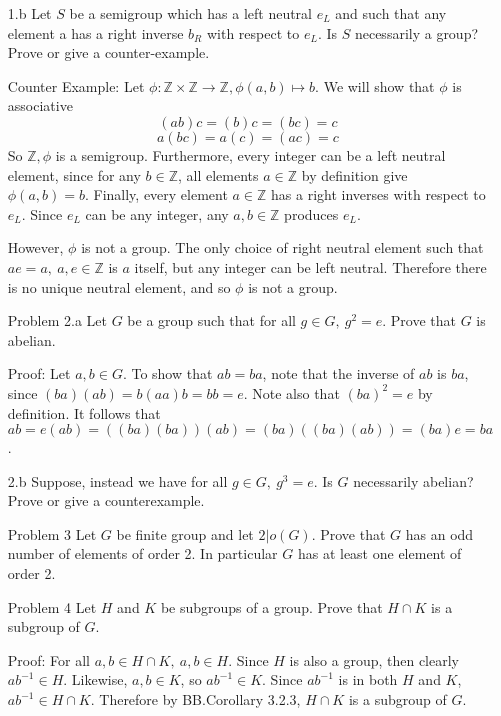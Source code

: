 \documentclass[letterpaper]{article}
\newcommand{\Integers}{\mathbb{Z}}
\begin{document}
\begin{itemize}
    \item[1.b] Let \(S\) be a semigroup which has a left neutral \(e_L\) and such that any element a has a right inverse \(b_R\) with respect to \(e_L\). Is \(S\) necessarily a group? Prove or give a counter-example.

          Counter Example: Let \(\phi: \Integers \times \Integers \rightarrow \Integers, \phi(a, b) \mapsto b\). We will show that  \(\phi\) is associative \[(ab)c = (b)c = (bc) = c\] \[a(bc) = a(c) = (ac) = c\]
          So \(\Integers, \phi\) is a semigroup. Furthermore, every integer can be a left neutral element, since for any \(b \in \Integers\), all elements \(a \in \Integers\) by definition give \(\phi(a, b) = b\).
          Finally, every element \(a \in \Integers\) has a right inverses with respect to \(e_L\). Since \(e_L\) can be any integer, any \(a, b \in \Integers\) produces \(e_L\).

          However, \(\phi\) is not a group. The only choice of right neutral element such that \(ae = a,\ a, e \in \Integers\) is \(a\) itself, but any integer can be left neutral. Therefore there is no unique neutral element, and so \(\phi\) is not a group.

    \item[Problem 2.a] Let \(G\) be a group such that for all \(g \in G,\ g^2 = e\). Prove that \(G\) is abelian.

          Proof: Let \(a, b \in G\). To show that \(ab = ba\), note that the inverse of \(ab\) is \(ba\), since \((ba)(ab) = b(aa)b = bb = e\). Note also that \({(ba)}^2 = e\) by definition. It follows that \(ab = e(ab) = ((ba)(ba))(ab) = (ba)((ba)(ab)) = (ba)e = ba\).

    \item[2.b] Suppose, instead we have for all  \(g \in G,\ g^3 = e\). Is \(G\) necessarily abelian? Prove or give a counterexample.

    \item[Problem 3] Let \(G\) be finite group and let \(2| o(G)\). Prove that \(G\) has an odd number of elements of order 2. In particular \(G\) has at least one element of order 2.

    \item[Problem 4]  Let \(H\) and \(K\) be subgroups of a group. Prove that \(H \cap K\) is a subgroup of \(G\).

          Proof: For all \(a, b \in H \cap K,\ a, b \in H\). Since \(H\) is also a group, then clearly \(ab^{-1} \in H\). Likewise, \(a, b \in K\), so \(ab^{-1} \in K\). Since \(ab^{-1}\) is in both \(H\) and \(K\), \(ab^{-1}\in H \cap K\). Therefore by BB.Corollary 3.2.3, \(H \cap K\) is a subgroup of \(G\).


\end{itemize}
\end{document}

